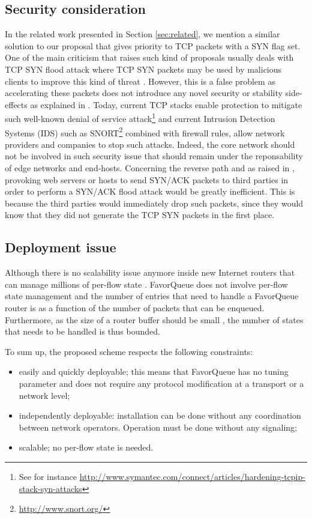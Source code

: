 \documentclass{elsart}
\begin{document}
\subsection{Security consideration}

In the related work presented in Section \ref{sec:related}, we mention a similar solution to our proposal that gives priority to TCP packets with a SYN flag set. One of the main criticism 
that raises such kind of proposals usually deals with TCP SYN flood attack where TCP SYN packets may be used by malicious clients to improve this kind of threat \cite{rfc4987}.
However, this is a false problem as accelerating these packets does not introduce any novel security or stability side-effects as explained in \cite{Kuzmanovic05}.
Today, current TCP stacks enable protection to mitigate such well-known 
denial of service attack\footnote{See for instance \url{http://www.symantec.com/connect/articles/hardening-tcpip-stack-syn-attacks}} and current Intrusion Detection Systems (IDS) such as SNORT\footnote{\url{http://www.snort.org/}} 
combined with firewall rules, allow network providers and companies to stop such attacks. 
Indeed, the core network should not be involved in such security issue that should remain under the reponsability of edge networks and end-hosts.
Concerning the reverse path and as raised in \cite{Kuzmanovic05}, provoking web servers or hosts to send SYN/ACK packets to third parties in order to perform a SYN/ACK flood attack would be greatly inefficient. 
This is because the third parties would immediately drop such packets, since they would know that they did not generate the TCP SYN packets in the first place.

\subsection{Deployment issue}

Although there is no scalability issue anymore inside new Internet routers that can manage millions of per-flow state \cite{roberts09}. FavorQueue does not involve per-flow state management and the number of entries
that need to handle a FavorQueue router is as a function of the number of packets that can be enqueued. Furthermore, as the size of a router buffer should be small \cite{Ganjali06}, the number of states that needs to be handled is thus bounded.

To sum up, the proposed scheme respects the following constraints:
\begin{itemize}
\item easily and quickly deployable; this means that FavorQueue has no tuning parameter and does not require any protocol modification at a transport or a network level;
\item independently deployable: installation can be done without any coordination  between network operators. Operation must be done without any signaling;
\item scalable; no per-flow state is needed.
\end{itemize}
\end{document}
